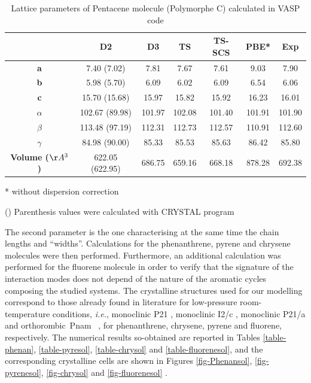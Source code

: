  	\begin{table}[H]
 		\caption{Lattice parameters of Pentacene molecule (Polymorphe C) calculated in VASP code} \label{table-pentaC}
 		\begin{center}
 			\begin{threeparttable}
 			\begin{tabular}{c c c c c c c}
 				\toprule
 				& \textbf{D2} & \textbf{D3} & \textbf{TS} & \textbf{TS-SCS} & \textbf{PBE*} & \textbf{Exp} \\
 				\midrule
 				\textbf{a} &7.40 (7.02) & 7.81 & 7.67 & 7.61 & 9.03 & 7.90\\
 				\textbf{b}& 5.98 (5.70) & 6.09 & 6.02 & 6.09 & 6.54 & 6.06 \\
 				\textbf{c}& 15.70 (15.68) & 15.97 & 15.82 & 15.92 & 16.23 & 16.01 \\
 				\textbf{$\alpha$} & 102.67 (89.98) & 101.97 & 102.08 & 101.40 & 101.91 & 101.90\\
 				\textbf{$\beta$} & 113.48 (97.19) & 112.31 & 112.73 & 112.57 & 110.91 & 112.60\\
 				\textbf{$\gamma$} &84.98 (90.00) & 85.33 & 85.53 & 85.63 & 86.42 & 85.80\\
 				\textbf{Volume ($\AA^{3}$)} & 622.05 (622.95) & 686.75 & 659.16 & 668.18  & 878.28 & 692.38\\
 				\bottomrule
 			\end{tabular}
 			
 				\begin{tablenotes}
 					\item[*] without dispersion correction
 					\item[()] Parenthesis values were calculated with CRYSTAL program
 				\end{tablenotes}
 			\end{threeparttable}
 		\end{center}
 	\end{table}
 	
 	The second parameter is the one characterising at the same time the chain lengths and “widths”. Calculations for the phenanthrene, pyrene and chrysene molecules were then performed. Furthermore, an additional calculation was performed for the fluorene molecule in order to verify that the signature of the interaction modes does not depend of the nature of the aromatic cycles composing the studied systems. The crystalline structures used for our modelling correspond to those already found in literature for low-pressure room-temperature conditions, \textit{i.e.}, monoclinic P21 \cite{fabbiani2006exploration}, monoclinic I2/c \cite{burns1960refinement}, monoclinic P21/a \cite{fabbiani2006exploration} and orthorombic Pnam  \cite{belsky1984fluorene}, for phenanthrene, chrysene, pyrene and fluorene, respectively. The numerical results so-obtained are reported in Tables \ref{table-phenan}, \ref{table-pyresol}, \ref{table-chrysol} and \ref{table-fluorenesol}, and the corresponding crystalline cells are shown in Figures \ref{fig-Phenansol}, \ref{fig-pyrenesol}, \ref{fig-chrysol} and \ref{fig-fluorenesol} .
 	
